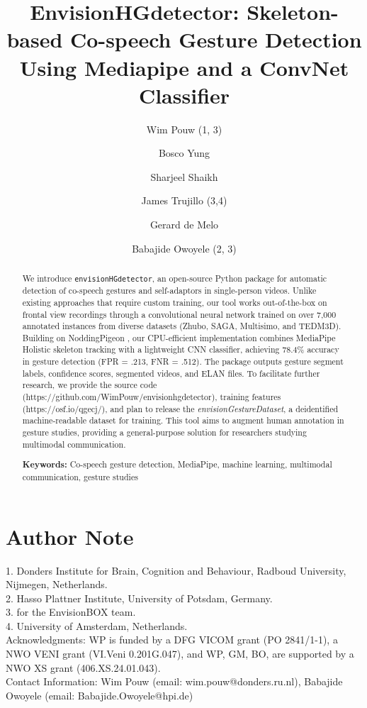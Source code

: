 \documentclass[12pt,a4paper]{article}
\title{EnvisionHGdetector: Skeleton-based Co-speech Gesture Detection Using Mediapipe and a ConvNet Classifier}
\author{Wim Pouw (1, 3) \and Bosco Yung \and Sharjeel Shaikh \and James Trujillo (3,4) \and Gerard de Melo  \and Babajide Owoyele (2, 3)}
\date{}
\begin{document}
\maketitle

\section*{Author Note}
1. Donders Institute for Brain, Cognition and Behaviour, Radboud University, Nijmegen, Netherlands.\\
2. Hasso Plattner Institute, University of Potsdam, Germany.\\
3. for the EnvisionBOX team.\\
4. University of Amsterdam, Netherlands. \\

Acknowledgments: WP is funded by a DFG VICOM grant (PO 2841/1-1), a NWO VENI grant (VI.Veni 0.201G.047), and WP, GM, BO, are supported by a NWO XS grant (406.XS.24.01.043). \\
Contact Information: Wim Pouw (email: wim.pouw@donders.ru.nl), Babajide Owoyele (email: Babajide.Owoyele@hpi.de)

\newpage

\begin{abstract}
We introduce \texttt{envisionHGdetector}, an open-source Python package for automatic detection of co-speech gestures and self-adaptors in single-person videos. Unlike existing approaches that require custom training, our tool works out-of-the-box on frontal view recordings through a convolutional neural network trained on over 7,000 annotated instances from diverse datasets (Zhubo, SAGA, Multisimo, and TEDM3D). Building on NoddingPigeon \cite{yungNoddingPigeon2022}, our CPU-efficient implementation combines MediaPipe Holistic skeleton tracking with a lightweight CNN classifier, achieving 78.4\% accuracy in gesture detection (FPR = .213, FNR = .512). The package outputs gesture segment labels, confidence scores, segmented videos, and ELAN files. To facilitate further research, we provide the source code (https://github.com/WimPouw/envisionhgdetector), training features (https://osf.io/qgecj/), and plan to release the \textit{envisionGestureDataset}, a deidentified machine-readable dataset for training. This tool aims to augment human annotation in gesture studies, providing a general-purpose solution for researchers studying multimodal communication.

\noindent\textbf{Keywords:} Co-speech gesture detection, MediaPipe, machine learning, multimodal communication, gesture studies
\end{abstract}
\end{document}
